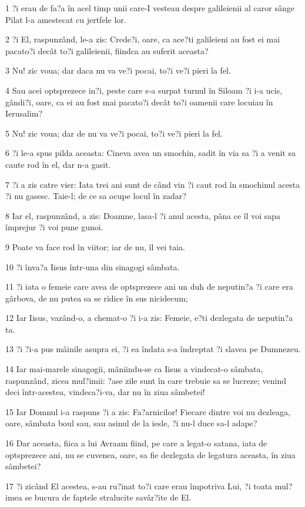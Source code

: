 \par 1 ?i erau de fa?a în acel timp unii care-I vesteau despre galileienii al caror sânge Pilat l-a amestecat cu jertfele lor.
\par 2 ?i El, raspunzând, le-a zis: Crede?i, oare, ca ace?ti galileieni au fost ei mai  pacato?i decât to?i galileienii, fiindca au suferit aceasta?
\par 3 Nu! zic voua; dar daca nu va ve?i pocai, to?i ve?i pieri la fel.
\par 4 Sau acei optsprezece in?i, peste care s-a surpat turnul în Siloam ?i i-a ucis, gândi?i, oare, ca ei au fost mai pacato?i decât to?i oamenii care locuiau în Ierusalim?
\par 5 Nu! zic voua; dar de nu va ve?i pocai, to?i ve?i pieri la fel.
\par 6 ?i le-a spus pilda aceasta: Cineva avea un smochin, sadit în via sa ?i a venit sa caute rod în el, dar n-a gasit.
\par 7 ?i a zis catre vier: Iata trei ani sunt de când vin ?i caut rod în smochinul acesta ?i nu gasesc. Taie-l; de ce sa ocupe locul în zadar?
\par 8 Iar el, raspunzând, a zis: Doamne, lasa-l ?i anul acesta, pâna ce îl voi sapa împrejur ?i voi pune gunoi.
\par 9 Poate va face rod în viitor; iar de nu, îl vei taia.
\par 10 ?i înva?a Iisus într-una din sinagogi sâmbata.
\par 11 ?i iata o femeie care avea de optsprezece ani un duh de neputin?a ?i care era gârbova, de nu putea sa se ridice în sus nicidecum;
\par 12 Iar Iisus, vazând-o, a chemat-o ?i i-a zis: Femeie, e?ti dezlegata de neputin?a ta.
\par 13 ?i ?i-a pus mâinile asupra ei, ?i ea îndata s-a îndreptat ?i slavea pe Dumnezeu.
\par 14 Iar mai-marele sinagogii, mâniindu-se ca Iisus a vindecat-o sâmbata, raspunzând, zicea mul?imii: ?ase zile sunt în care trebuie sa se lucreze; venind deci într-acestea, vindeca?i-va, dar nu în ziua sâmbetei!
\par 15 Iar Domnul i-a raspuns ?i a zis: Fa?arnicilor! Fiecare dintre voi nu dezleaga, oare, sâmbata boul sau, sau asinul de la iesle, ?i nu-l duce sa-l adape?
\par 16 Dar aceasta, fiica a lui Avraam fiind, pe care a legat-o satana, iata de optsprezece ani, nu se cuvenea, oare, sa fie dezlegata de legatura aceasta, în ziua sâmbetei?
\par 17 ?i zicând El acestea, s-au ru?inat to?i care erau împotriva Lui, ?i toata mul?imea se bucura de faptele stralucite savâr?ite de El.
